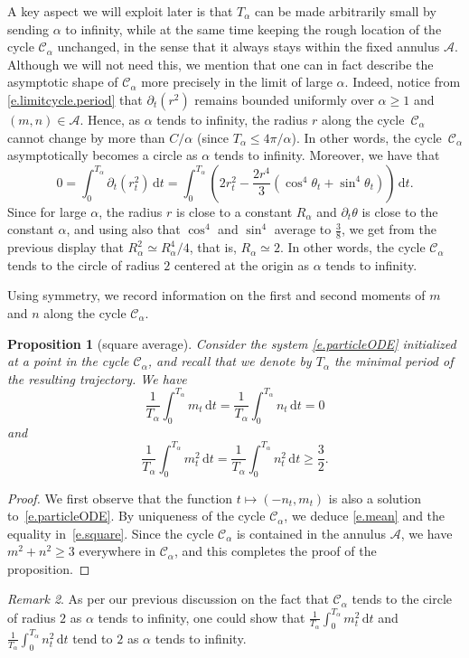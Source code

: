 \documentclass[11pt]{amsart}
\newtheorem{proposition}{Proposition}
\theoremstyle{remark}
\newtheorem{remark}[proposition]{Remark}
\theoremstyle{definition}
\numberwithin{equation}{section}
\numberwithin{proposition}{section}
\renewcommand{\le}{\leqslant}
\renewcommand{\ge}{\geqslant}
\newcommand{\Ll}{\left}
\newcommand{\Rr}{\right}
\renewcommand{\d}{\mathrm{d}}
\newcommand{\dr}{\partial}
\newcommand{\1}{\mathbf{1}}
\newcommand{\mcl}{\mathcal}
\newcommand{\msc}{\mathscr}
\newcommand{\al}{\alpha}
\begin{document}
A key aspect we will exploit later is that $T_\al$ can be made arbitrarily small by sending $\al$ to infinity, while at the same time keeping the rough location of the cycle $\msc C_\al$ unchanged, in the sense that it always stays within the fixed annulus $\mcl A$. Although we will not need this, we mention that one can in fact describe the asymptotic shape of $\msc C_\al$ more precisely in the limit of large $\al$. Indeed, notice from \eqref{e.limitcycle.period} that $\dr_t (r^2)$ remains bounded uniformly over $\al \ge 1$ and $(m,n) \in \mcl A$. Hence, as $\al$ tends to infinity, the radius $r$ along the cycle~$\msc C_\al$ cannot change by more than $C/\al$ (since $T_\al \le 4\pi/\al$). In other words, the cycle~$\msc C_\al$ asymptotically becomes a circle as $\al$ tends to infinity. Moreover, we have that
\begin{equation*}  %
0 =\int_0^{T_\al} \dr_t(r_t^2) \, \d t = \int_0^{T_\al} \Ll( 2 r_t^2 - \frac {2r^4} 3 (\cos^4 \theta_t + \sin^4 \theta_t)  \Rr) \, \d t .
\end{equation*}
Since for large $\alpha$, the radius $r$ is close to a constant $R_\al$ and $\dr_t \theta$ is close to the constant $\al$, and using also that $\cos^4$ and $\sin^4$ average to $\frac 3 8$, we get from the previous display that $R_\al^2 \simeq R_\al^4/4$, that is, $R_\al \simeq 2$. In other words, the cycle $\msc C_\al$ tends to the circle of radius $2$ centered at the origin as $\al$ tends to infinity.

Using symmetry, we record information on the first and second moments of $m$ and $n$ along the cycle $\msc C_\al$. 
\begin{proposition}[square average]
\label{p.square} Consider the system \eqref{e.particleODE} initialized at a point in the cycle $\msc C_\al$, and recall that we denote by $T_\al$ the minimal period of the resulting trajectory. We have
\begin{equation}
\label{e.mean}
\frac 1 {T_\al} \int_0^{T_\al} m_t \, \d t = \frac 1 {T_\al} \int_0^{T_\al} n_t \, \d t = 0
\end{equation}
and
\begin{equation}  
\label{e.square}
\frac 1 {T_\al} \int_0^{T_\al} m_t^2 \, \d t = \frac 1 {T_\al} \int_0^{T_\al} n_t^2 \, \d t \ge \frac 3 2.
\end{equation}
\end{proposition}
\begin{proof}
We first observe that the function $t \mapsto (-n_t, m_t)$ is also a solution to~\eqref{e.particleODE}. By uniqueness of the cycle $\msc C_\al$, we deduce \eqref{e.mean} and the equality in~\eqref{e.square}. Since the cycle $\msc C_\al$ is contained in the annulus $\mcl A$, we have $m^2 + n^2 \ge 3$ everywhere in $\msc C_\al$, and this completes the proof of the proposition.
\end{proof}
\begin{remark}  %
As per our previous discussion on the fact that $\msc C_\al$ tends to the circle of radius $2$ as $\al$ tends to infinity, one could show that $\frac 1 {T_\al} \int_0^{T_\al} m_t^2 \, \d t$ and $\frac 1 {T_\al} \int_0^{T_\al} n_t^2 \, \d t$ tend to $2$ as $\al$ tends to infinity.
\end{remark}
\end{document}
